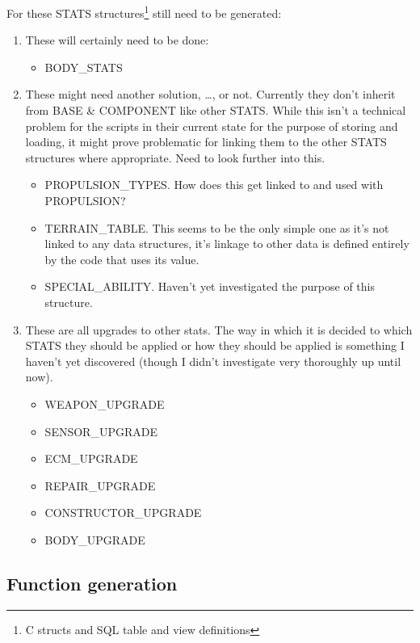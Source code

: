 \documentclass{article}
\begin{document}
For these STATS structures\footnote{C structs and SQL table and view
definitions} still need to be generated:
\begin{enumerate}
  \item These will certainly need to be done:
    \begin{itemize}
      \item BODY\_STATS
    \end{itemize}
  \item These might need another solution, \ldots, or not. Currently they don't
    inherit from BASE \& COMPONENT like other STATS. While this isn't a
    technical problem for the scripts in their current state for the purpose of
    storing and loading, it might prove problematic for linking them to the
    other STATS structures where appropriate. Need to look further into this. 
    \begin{itemize}
      \item PROPULSION\_TYPES. How does this get linked to and used with
	PROPULSION?
      \item TERRAIN\_TABLE. This seems to be the only simple one as it's not
	linked to any data structures, it's linkage to other data is defined
	entirely by the code that uses its value.
      \item SPECIAL\_ABILITY. Haven't yet investigated the purpose of this
	structure.
    \end{itemize}
  \item These are all upgrades to other stats. The way in which it is decided to
    which STATS they should be applied or how they should be applied is
    something I haven't yet discovered (though I didn't investigate very
    thoroughly up until now).
    \begin{itemize}
      \item WEAPON\_UPGRADE
      \item SENSOR\_UPGRADE
      \item ECM\_UPGRADE
      \item REPAIR\_UPGRADE
      \item CONSTRUCTOR\_UPGRADE
      \item BODY\_UPGRADE	
    \end{itemize}
\end{enumerate}

\subsection{Function generation}
\end{document}
